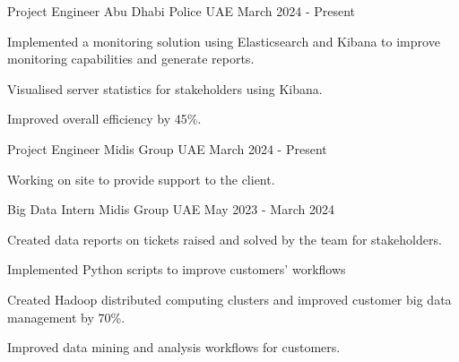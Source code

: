 

\begin{cventries}
	
	\cventry
	{Project Engineer} %
	{Abu Dhabi Police} %
	{UAE} %
	{March 2024 - Present} %
	{
		\begin{cvitems} %
			\item Implemented a monitoring solution using Elasticsearch and Kibana to improve monitoring capabilities and generate reports.
            \item Visualised server statistics for stakeholders using Kibana.
			\item Improved overall efficiency by 45\%.
		\end{cvitems}
	}
	
	\cventry
 	{Project Engineer} %
	{Midis Group} %
	{UAE} %
	{March 2024 - Present} %
	{
		\begin{cvitems} %
			\item Working on site to provide support to the client.
		\end{cvitems}
  }
  \cventry
	{Big Data Intern} %
	{Midis Group} %
	{UAE} %
	{May 2023 - March 2024} %
	{
		\begin{cvitems} %
			\item Created data reports on tickets raised and solved by the team for stakeholders.
			\item Implemented Python scripts to improve customers' workflows
			\item Created Hadoop distributed computing clusters and improved customer big data management by 70\%.
			\item Improved data mining and analysis  workflows for customers.
		\end{cvitems}
	}
	

\end{cventries}
